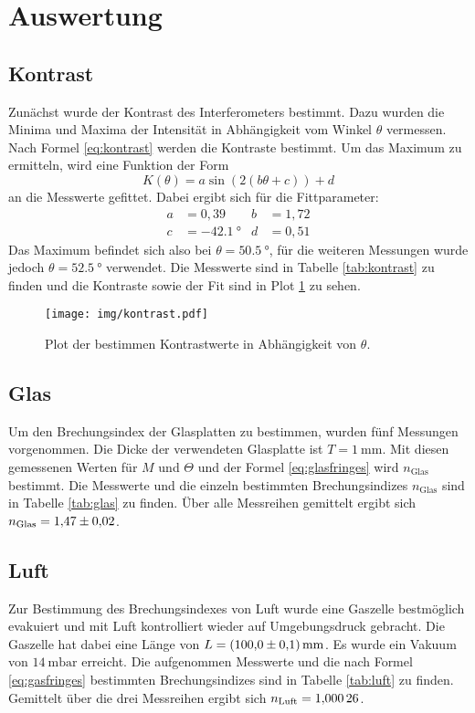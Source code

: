 \section{Auswertung}
\label{sec:Auswertung}


\subsection{Kontrast}

Zunächst wurde der Kontrast des Interferometers bestimmt. Dazu wurden die Minima und Maxima der Intensität in Abhängigkeit vom Winkel $\theta$ vermessen. Nach Formel \eqref{eq:kontrast} werden die Kontraste bestimmt.  Um das Maximum zu ermitteln, wird eine Funktion der Form
\begin{equation}
  K(\theta)=a\sin(2(b\theta+c))+d
\end{equation}
an die Messwerte gefittet. Dabei ergibt sich für die Fittparameter:
\begin{align}
  a&=\si{0,39} & b&=\si{1,72} \\
  c&=\SI{-42,1}{°} & d&=\si{0,51}
\end{align}
Das Maximum befindet sich also bei $\theta=\SI{50,5}{°}$, für die weiteren Messungen wurde jedoch $\theta=\SI{52.5}{°}$ verwendet.
Die Messwerte sind in Tabelle \ref{tab:kontrast} zu finden und die  Kontraste sowie der Fit sind in Plot \ref{img:kontrast} zu sehen.
\begin{figure}
  \centering
  \texttt{[image: img/kontrast.pdf]}
  \caption{Plot der bestimmen Kontrastwerte in Abhängigkeit von $\theta$.}
  \label{img:kontrast}
\end{figure}




\subsection{Glas}

Um den Brechungsindex der Glasplatten zu bestimmen, wurden fünf Messungen vorgenommen. Die Dicke der verwendeten Glasplatte ist $T=\SI{1}{\milli\meter}$.
Mit diesen gemessenen Werten für $M$ und $\Theta$ und der Formel \eqref{eq:glasfringes} wird $n_\text{Glas}$ bestimmt. Die Messwerte und die einzeln bestimmten Brechungsindizes
 $n_\text{Glas}$ sind in Tabelle \ref{tab:glas} zu finden.
Über alle Messreihen gemittelt ergibt sich $n_\text{Glas}=\num{1,47\pm 0,02}$.




\subsection{Luft}

Zur Bestimmung des Brechungsindexes von Luft wurde eine Gaszelle bestmöglich evakuiert und mit Luft kontrolliert wieder auf Umgebungsdruck gebracht. Die Gaszelle hat dabei eine Länge von $L=\SI{100\pm 0.1}{\milli \meter}$. Es wurde ein
Vakuum von $\SI{14}{\milli \bar}$ erreicht. Die aufgenommen Messwerte und die nach Formel \eqref{eq:gasfringes} bestimmten Brechungsindizes sind in Tabelle \ref{tab:luft} zu finden.
Gemittelt über die drei Messreihen ergibt sich $n_\text{Luft}=\num{1.00026 \pm 0.00000}$.

